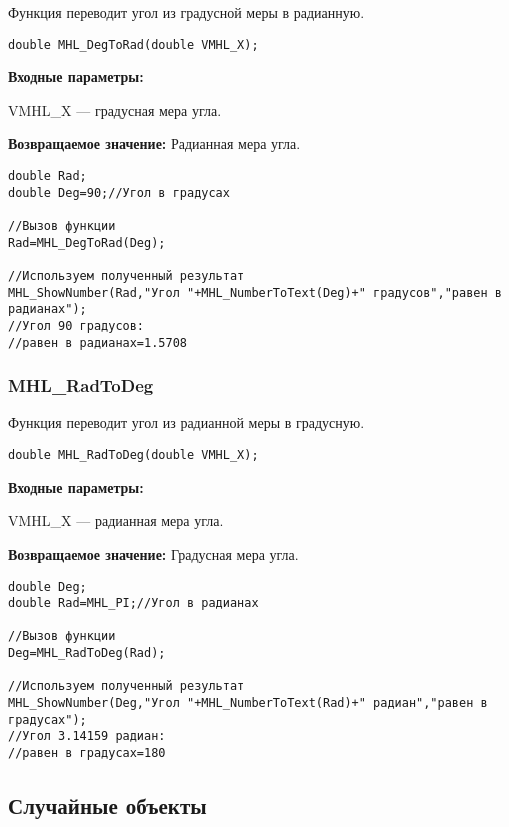 \documentclass[a4paper,12pt]{article}
\begin{document}
Функция переводит угол из градусной меры в радианную.


\begin{lstlisting}[label=code_syntax_MHL_DegToRad,caption=Синтаксис]
double MHL_DegToRad(double VMHL_X);
\end{lstlisting}

\textbf{Входные параметры:}

 VMHL\_X --- градусная мера угла.

\textbf{Возвращаемое значение:}
Радианная мера угла.


\begin{lstlisting}[label=code_use_MHL_DegToRad,caption=Пример использования]
double Rad;
double Deg=90;//Угол в градусах

//Вызов функции
Rad=MHL_DegToRad(Deg);

//Используем полученный результат
MHL_ShowNumber(Rad,"Угол "+MHL_NumberToText(Deg)+" градусов","равен в радианах");
//Угол 90 градусов:
//равен в радианах=1.5708
\end{lstlisting}

\subsubsection{MHL\_RadToDeg}\label{MHL_RadToDeg}

Функция переводит угол из радианной меры в градусную.


\begin{lstlisting}[label=code_syntax_MHL_RadToDeg,caption=Синтаксис]
double MHL_RadToDeg(double VMHL_X);
\end{lstlisting}

\textbf{Входные параметры:}

 VMHL\_X --- радианная мера угла.

\textbf{Возвращаемое значение:}
Градусная мера угла.


\begin{lstlisting}[label=code_use_MHL_RadToDeg,caption=Пример использования]
double Deg;
double Rad=MHL_PI;//Угол в радианах

//Вызов функции
Deg=MHL_RadToDeg(Rad);

//Используем полученный результат
MHL_ShowNumber(Deg,"Угол "+MHL_NumberToText(Rad)+" радиан","равен в градусах");
//Угол 3.14159 радиан:
//равен в градусах=180
\end{lstlisting}

\subsection{Случайные объекты}
\end{document}
